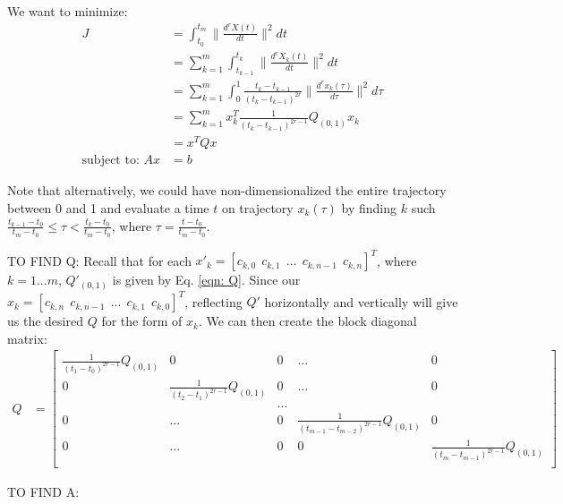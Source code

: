 \documentclass[11pt]{article}
\begin{document}
\mbox{} \newline
We want to minimize:
\begin{align*}
J &= \int_{t_0}^{t_m} \|  \frac{d^{r} X(t) }{dt} \|^2 dt \\
&= \sum_{k=1}^{m} \int_{t_{k-1}}^{t_k} \|  \frac{d^{r} X_k (t) }{dt} \|^2 dt  \\
&= \sum_{k=1}^{m} \int_{0}^{1} \frac{t_k-t_{k-1}}{(t_k-t_{k-1})^{2r}} \|  \frac{d^{r} x_k (\tau) }{d\tau} \|^2 d\tau  \\
&=  \sum_{k=1}^{m} x_k^T \frac{1}{(t_k-t_{k-1})^{2r-1}} Q_{(0, 1)} x_k \\
&= x^T Q x \\
\text{subject to: } A x &=b
\end{align*}

\mbox{} \newline
Note that alternatively, we could have non-dimensionalized the entire trajectory between 0 and 1 and evaluate a time $t$ on trajectory $x_k(\tau)$ by finding $k$ such $\frac{t_{k-1}-t_0}{t_m-t_0} \le \tau < \frac{t_{k}-t_0}{t_m-t_0}$, where $\tau = \frac{t-t_0}{t_m-t_0}$. 



\mbox{} \newline
\mbox{} \newline
TO FIND Q: \newline
Recall that for each $x'_k = [c_{k, 0} \ \ c_{k, 1} \ \ ... \ \ c_{k, n-1} \ \ c_{k, n}]^T$, where $k = 1...m$, $Q'_{(0, 1)}$ is given by Eq. \ref{eqn: Q}. Since our $x_k = [c_{k, n} \ \ c_{k, n-1} \ \ ... \ \ c_{k, 1} \ \ c_{k, 0}]^T$, reflecting $Q'$ horizontally and vertically will give us the desired $Q$ for the form of $x_k$. We can then create the block diagonal matrix:
\begin{align}
\label{eqn: Qkeyframes} Q &= 
\begin{bmatrix}
  \frac{1}{(t_1-t_{0})^{2r-1}} Q_{(0, 1)} & 0 & 0 & ... & 0 \\
  0 & \frac{1}{(t_2-t_{1})^{2r-1}} Q_{(0, 1)} & 0 & ... & 0 \\
  & & ... & &  \\
  0 & ... & 0 & \frac{1}{(t_{m-1}-t_{m-2})^{2r-1}} Q_{(0, 1)} & 0 \\
  0 & ... & 0 & 0 & \frac{1}{(t_m-t_{m-1})^{2r-1}} Q_{(0, 1)} \\ 
 \end{bmatrix}
\end{align}



\mbox{} \newline
\mbox{} \newline
TO FIND A: \newline
\end{document}
